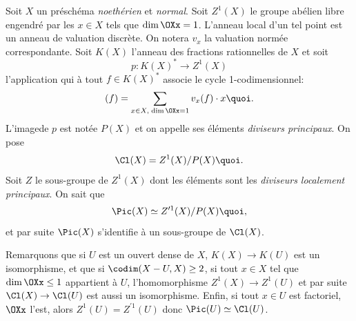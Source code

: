 Soit $X$ un pr\'esch\'ema \emph{noeth\'erien} et \emph{normal}. Soit $Z^1(X)$ le groupe ab\'elien libre engendr\'e par les $x\in X$ tels que $\dim\OXx=1$. L'anneau local d'un tel point est un anneau de valuation discr\`ete. On notera $v_x$ la valuation norm\'ee correspondante. Soit $K(X)$ l'anneau des fractions rationnelles de $X$ et soit
\[
p\colon K(X)^*\to Z^1(X)
\]
l'application qui \`a tout $f\in K(X)^*$ associe le cycle 1-codimensionnel:
\[
(f) = \sum_{x\in X, \;\dim\OXx=1} v_x(f)\cdot x{\quoi}.
\]
L'image\pageoriginale de $p$ est not\'ee $P(X)$ et on appelle ses \'el\'ements \emph{diviseurs principaux}. On pose
\[
\Cl(X) = Z^1(X)/P(X){\quoi}.
\]
Soit $Z$ le sous-groupe de $Z^1(X)$ dont les \'el\'ements sont les \emph{diviseurs localement principaux}. On sait que
\[
\Pic(X)\simeq Z^{\prime1}(X)/P(X){\quoi},
\]
et par suite $\Pic(X)$ s'identifie \`a un sous-groupe de $\Cl(X)$.

Remarquons que si $U$ est un ouvert dense de $X$, $K(X)\to K(U)$ est un isomorphisme, et que si $\codim(X-U, X)\geq 2$, \ie si tout $x\in X$ tel que $\dim\OXx\leq 1$ appartient \`a $U$, l'homomorphisme $Z^1(X)\to Z^1(U)$ et par suite $\Cl(X)\to\Cl(U)$ est aussi un isomorphisme. Enfin, si tout $x\in U$ est factoriel, \ie $\OXx$ l'est, alors $Z^1(U) = Z^{\prime1}(U)$ donc $\Pic(U)\simeq\Cl(U)$.

